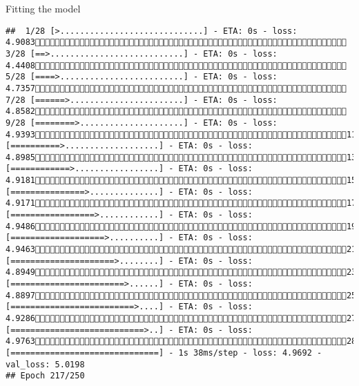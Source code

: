 \documentclass[
  ignorenonframetext,
]{beamer}
\begin{document}
\begin{frame}[fragile]{Fitting the model}
\begin{verbatim}
##  1/28 [>.............................] - ETA: 0s - loss: 4.9083 3/28 [==>...........................] - ETA: 0s - loss: 4.4408 5/28 [====>.........................] - ETA: 0s - loss: 4.7357 7/28 [======>.......................] - ETA: 0s - loss: 4.8582 9/28 [========>.....................] - ETA: 0s - loss: 4.939311/28 [==========>...................] - ETA: 0s - loss: 4.898513/28 [============>.................] - ETA: 0s - loss: 4.918115/28 [===============>..............] - ETA: 0s - loss: 4.917117/28 [=================>............] - ETA: 0s - loss: 4.948619/28 [===================>..........] - ETA: 0s - loss: 4.946321/28 [=====================>........] - ETA: 0s - loss: 4.894923/28 [=======================>......] - ETA: 0s - loss: 4.889725/28 [=========================>....] - ETA: 0s - loss: 4.928627/28 [===========================>..] - ETA: 0s - loss: 4.976328/28 [==============================] - 1s 38ms/step - loss: 4.9692 - val_loss: 5.0198
## Epoch 217/250

\end{verbatim}
\end{frame}
\end{document}
